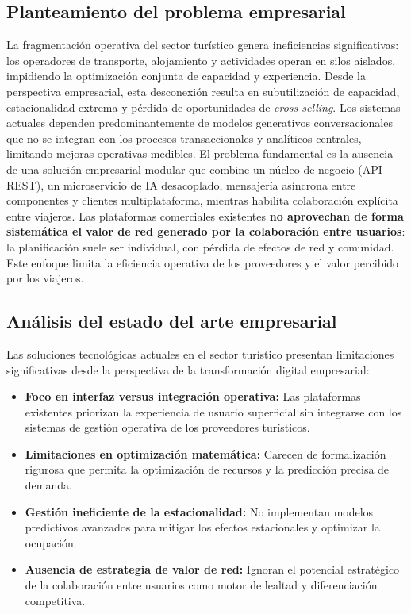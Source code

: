 \documentclass[12pt, letterpaper]{article}
\begin{document}
\subsection*{Planteamiento del problema empresarial}

La fragmentación operativa del sector turístico genera ineficiencias significativas: los operadores de transporte, alojamiento y actividades operan en silos aislados, impidiendo la optimización conjunta de capacidad y experiencia. Desde la perspectiva empresarial, esta desconexión resulta en subutilización de capacidad, estacionalidad extrema y pérdida de oportunidades de \textit{cross-selling}. Los sistemas actuales dependen predominantemente de modelos generativos conversacionales que no se integran con los procesos transaccionales y analíticos centrales, limitando mejoras operativas medibles. El problema fundamental es la ausencia de una solución empresarial modular que combine un núcleo de negocio (API REST), un microservicio de IA desacoplado, mensajería asíncrona entre componentes y clientes multiplataforma, mientras habilita colaboración explícita entre viajeros. Las plataformas comerciales existentes \textbf{no aprovechan de forma sistemática el valor de red generado por la colaboración entre usuarios}: la planificación suele ser individual, con pérdida de efectos de red y comunidad. Este enfoque limita la eficiencia operativa de los proveedores y el valor percibido por los viajeros.

\subsection*{Análisis del estado del arte empresarial}

Las soluciones tecnológicas actuales en el sector turístico presentan limitaciones significativas desde la perspectiva de la transformación digital empresarial:

\begin{itemize}
\item \textbf{Foco en interfaz versus integración operativa:} Las plataformas existentes priorizan la experiencia de usuario superficial sin integrarse con los sistemas de gestión operativa de los proveedores turísticos.
\item \textbf{Limitaciones en optimización matemática:} Carecen de formalización rigurosa que permita la optimización de recursos y la predicción precisa de demanda.
\item \textbf{Gestión ineficiente de la estacionalidad:} No implementan modelos predictivos avanzados para mitigar los efectos estacionales y optimizar la ocupación.
\item \textbf{Ausencia de estrategia de valor de red:} Ignoran el potencial estratégico de la colaboración entre usuarios como motor de lealtad y diferenciación competitiva.
\end{itemize}
\end{document}
